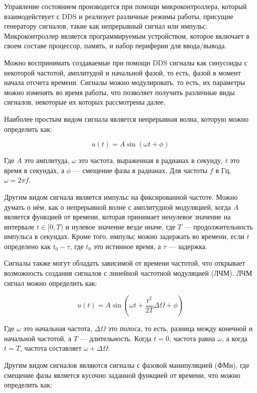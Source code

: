 \documentclass{report}
\begin{document}
Управление состоянием производится при помощи микроконтроллера, который взаимодействует с DDS и реализует различные режимы работы, присущие генератору сигналов, такие как непрерывный сигнал или импульс. Микроконтроллер является программируемым устройством, которое включает в своем составе процессор, память, и набор периферии для ввода/вывода.

Можно воспринимать создаваемые при помощи DDS сигналы как синусоиды с некоторой частотой, амплитудой и начальной фазой, то есть, фазой в момент начала отсчета времени. Сигналы можно модулировать, то есть, их параметры можно изменять во время работы, что позволяет получить различные виды сигналов, некоторые их которых рассмотрены далее.

Наиболее простым видом сигнала является непрерывная волна, которую можно определить как:

\begin{equation}
u(t) = A \sin (\omega t + \phi)
\end{equation}

Где $A$ это амплитуда, $\omega$ это частота, выраженная в радианах в секунду, $t$ это время в секундах, а $\phi$ --- смещение фазы в радианах. Для частоты $f$ в Гц, $\omega = 2 \pi f$.

Другим видом сигнала является импульс на фиксированной частоте. Можно думать о нём, как о непрерывной волне с амплитудной модуляцией, когда $A$ является функцией от времени, которая принимает ненулевое значение на интервале $t \in [0, T)$ и нулевое значение везде иначе, где $T$ --- продолжительность импульса в секундах. Кроме того, импульс можно задержать во времени, если $t$ определено как $t_0 - \tau$, где $t_0$ это истинное время, а $\tau$ --- задержка.

Сигналы также могут обладать зависимой от времени частотой, что открывает возможность создания сигналов с линейной частотной модуляцией (ЛЧМ). ЛЧМ сигнал можно определить как:

\begin{equation}
u(t) = A \sin (\omega t + \frac{t^2}{2T} \Delta \Omega + \phi)
\end{equation}

Где $\omega$ это начальная частота, $\Delta \Omega$ это полоса, то есть, разница между конечной и начальной частотой, а $T$ --- длительность. Когда $t=0$, частота равна $\omega$, а когда $t=T$, частота составляет $\omega + \Delta \Omega$.

Другим видом сигналов являются сигналы с фазовой манипуляцией (ФМн), где смещение фазы является кусочно заданной функцией от времени, что можно определить как:
\end{document}

